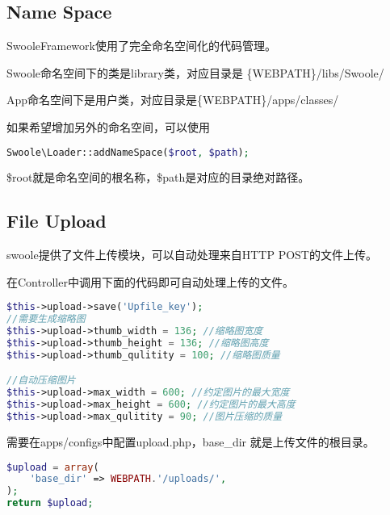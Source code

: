 \begin{lstlisting}[language=PHP]

\end{lstlisting}




\subsection{Name Space}


SwooleFramework使用了完全命名空间化的代码管理。

\begin{compactitem}
\item Swoole命名空间下的类是library类，对应目录是 \{WEBPATH\}/libs/Swoole/
\item App命名空间下是用户类，对应目录是\{WEBPATH\}/apps/classes/
\end{compactitem}


如果希望增加另外的命名空间，可以使用



\begin{lstlisting}[language=PHP]
Swoole\Loader::addNameSpace($root, $path);
\end{lstlisting}


\$root就是命名空间的根名称，\$path是对应的目录绝对路径。


\subsection{File Upload}


swoole提供了文件上传模块，可以自动处理来自HTTP POST的文件上传。

在Controller中调用下面的代码即可自动处理上传的文件。

\begin{lstlisting}[language=PHP]
$this->upload->save('Upfile_key');
//需要生成缩略图
$this->upload->thumb_width = 136; //缩略图宽度
$this->upload->thumb_height = 136; //缩略图高度
$this->upload->thumb_qulitity = 100; //缩略图质量

//自动压缩图片
$this->upload->max_width = 600; //约定图片的最大宽度
$this->upload->max_height = 600; //约定图片的最大高度
$this->upload->max_qulitity = 90; //图片压缩的质量
\end{lstlisting}


需要在apps/configs中配置upload.php，base\_dir 就是上传文件的根目录。

\begin{lstlisting}[language=PHP]
$upload = array(
    'base_dir' => WEBPATH.'/uploads/',
);
return $upload;
\end{lstlisting}


